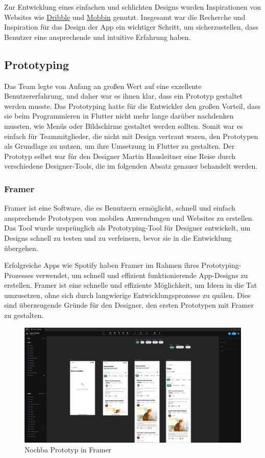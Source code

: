 Zur Entwicklung eines einfachen und schlichten Designs wurden Inspirationen von Websites wie \href{https://dribbble.com/}{Dribble} und \href{https://mobbin.design/}{Mobbin} genutzt. Insgesamt war die Recherche und Inspiration für das Design der App ein wichtiger Schritt, um sicherzustellen, dass Benutzer eine ansprechende und intuitive Erfahrung haben.

\subsection{Prototyping}
Das Team legte von Anfang an großen Wert auf eine exzellente
Benutzererfahrung, und daher war es ihnen klar, dass ein
Prototyp gestaltet werden musste. Das Prototyping hatte für
die Entwickler den großen Vorteil, dass sie beim
Programmieren in Flutter nicht mehr lange darüber nachdenken
mussten, wie Menüs oder Bildschirme gestaltet werden
sollten. Somit war es einfach für Teammitglieder, die nicht
mit Design vertraut waren, den Prototypen als Grundlage zu
nutzen, um ihre Umsetzung in Flutter zu gestalten. Der
Prototyp selbst war für den Designer Martin Hausleitner eine
Reise durch verschiedene Designer-Tools, die im folgenden
Absatz genauer behandelt werden.


\subsubsection{Framer}

Framer ist eine Software, die es Benutzern ermöglicht, schnell und einfach ansprechende Prototypen von mobilen Anwendungen und Websites zu erstellen. Das Tool wurde ursprünglich als Prototyping-Tool für Designer entwickelt, um Designs schnell zu testen und zu verfeinern, bevor sie in die Entwicklung übergehen.

Erfolgreiche Apps wie Spotify haben Framer im Rahmen ihres
Prototyping-Prozesses verwendet, um schnell und effizient
funktionierende App-Designs zu erstellen. Framer ist eine
schnelle und effiziente Möglichkeit, um Ideen in die Tat
umzusetzen, ohne sich durch langwierige Entwicklungsprozesse
zu quälen. Dies sind überzeugende Gründe für den Designer, den ersten Prototypen mit Framer zu gestalten.

\begin{figure}[h]
  \centering
  \includegraphics[width=1\textwidth]{pics/nochba-framer-prototype-screenshot.png}
  \caption{Nochba Prototyp in Framer}
  \label{fig:framer-prototype}
\end{figure}


